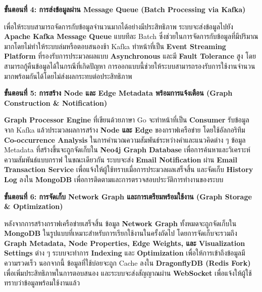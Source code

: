 \documentclass[12pt,a4paper]{article}
\begin{document}
\begin{enumerate}[leftmargin=2cm]
\begin{enumerate}
{            \vspace{0.3cm}

            \textbf{ขั้นตอนที่ 4: การส่งข้อมูลผ่าน Message Queue (Batch Processing via Kafka)}

            \hspace{1cm}เพื่อให้ระบบสามารถจัดการกับข้อมูลจำนวนมากได้อย่างมีประสิทธิภาพ ระบบจะส่งข้อมูลไปยัง \textbf{Apache Kafka Message Queue} แบบทีละ Batch ซึ่งช่วยในการจัดการกับข้อมูลที่มีปริมาณมากโดยไม่ทำให้ระบบล่มหรือตอบสนองช้า Kafka ทำหน้าที่เป็น \textbf{Event Streaming Platform} ที่รองรับการประมวลผลแบบ \textbf{Asynchronous} และมี \textbf{Fault Tolerance} สูง โดยสามารถกู้คืนข้อมูลได้ในกรณีที่เกิดปัญหา การออกแบบนี้ช่วยให้ระบบสามารถรองรับการใช้งานจำนวนมากพร้อมกันได้โดยไม่ส่งผลกระทบต่อประสิทธิภาพ

            \vspace{0.3cm}

            \textbf{ขั้นตอนที่ 5: การสร้าง Node และ Edge Metadata พร้อมการแจ้งเตือน (Graph Construction \& Notification)}

            \hspace{1cm}\textbf{Graph Processor Engine} ที่เขียนด้วยภาษา Go จะทำหน้าที่เป็น \textbf{Consumer} รับข้อมูลจาก Kafka แล้วประมวลผลการสร้าง \textbf{Node และ Edge} ของกราฟเครือข่าย โดยใช้อัลกอริทึม \textbf{Co-occurrence Analysis} ในการคำนวณความสัมพันธ์ระหว่างคำและแนวคิดต่าง ๆ ข้อมูล Metadata ที่สร้างขึ้นจะถูกจัดเก็บใน \textbf{Neo4j Graph Database} เพื่อการค้นหาและวิเคราะห์ความสัมพันธ์แบบกราฟ ในขณะเดียวกัน ระบบจะส่ง \textbf{Email Notification} ผ่าน \textbf{Email Transaction Service} เพื่อแจ้งให้ผู้ใช้ทราบเมื่อการประมวลผลเสร็จสิ้น และจัดเก็บ \textbf{History Log} ลงใน \textbf{MongoDB} เพื่อการติดตามและการตรวจสอบประวัติการทำงานของระบบ

            \vspace{0.3cm}

            \textbf{ขั้นตอนที่ 6: การจัดเก็บ Network Graph และการเตรียมพร้อมใช้งาน (Graph Storage \& Optimization)}

            \hspace{1cm}หลังจากการสร้างกราฟเครือข่ายเสร็จสิ้น ข้อมูล \textbf{Network Graph} ทั้งหมดจะถูกจัดเก็บใน \textbf{MongoDB} ในรูปแบบที่เหมาะสำหรับการเรียกใช้งานในครั้งถัดไป โดยการจัดเก็บจะรวมถึง \textbf{Graph Metadata, Node Properties, Edge Weights, และ Visualization Settings} ต่าง ๆ ระบบจะทำการ \textbf{Indexing} และ \textbf{Optimization} เพื่อให้การเข้าถึงข้อมูลมีความรวดเร็ว นอกจากนี้ ข้อมูลที่ใช้บ่อยจะถูก Cache ลงใน \textbf{DragonflyDB (Redis Fork)} เพื่อเพิ่มประสิทธิภาพในการตอบสนอง และระบบจะส่งสัญญาณผ่าน \textbf{WebSocket} เพื่อแจ้งให้ผู้ใช้ทราบว่าข้อมูลพร้อมใช้งานแล้ว

}
\end{enumerate}
\end{enumerate}
\end{document}
